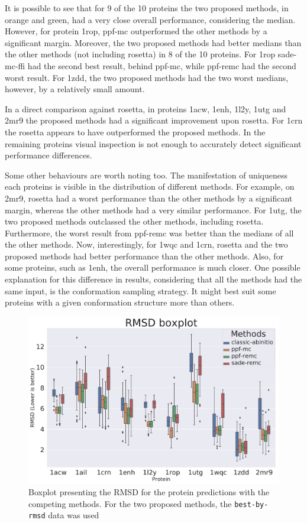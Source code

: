 It is possible to see that for 9 of the 10 proteins the
two proposed methods, in orange and green, had a very close overall performance,
considering the median.
However, for protein 1rop, ppf-mc outperformed the other methods by a
significant margin. Moreover, the two proposed methods had better medians than
the other methods (not including rosetta) in 8 of the 10 proteins. For 1rop
sade-mc-ffi had the second best result, behind ppf-mc, while ppf-remc
had the second worst result. For 1zdd, the two proposed methods had the two worst
medians, however, by a relatively small amount.

In a direct comparison against rosetta, in proteins 1acw, 1enh, 1l2y, 1utg and 2mr9
the proposed methods had a significant improvement upon rosetta. For 1crn the rosetta
appears to have outperformed the proposed methods. In the remaining proteins visual
inspection is not enough to accurately detect significant performance differences.

Some other behaviours are worth noting too. The manifestation of uniqueness each
proteins is visible in the distribution of different methods. For example, on
2mr9, rosetta had a worst performance than the other methods by a significant margin,
whereas the other methods had a very similar performance. For 1utg, the two proposed
methods outclassed the other methods, including rosetta. Furthermore, the worst
result from ppf-remc was better than the medians of all the other methods.
Now, interestingly, for 1wqc and 1crn, rosetta and the two proposed methods had
better performance than the other methods. Also, for some proteins, such as 1enh,
the overall performance is much closer. One possible explanation for this difference
in results, considering that all the methods had the same input, is the conformation
sampling strategy. It might best suit some proteins with a given conformation
structure more than others.

\begin{figure}
  \includegraphics[width=\linewidth]{Figuras/boxplots/boxplot_best_by_rmsd_rmsd_after.pdf}
  \caption{Boxplot presenting the RMSD for the protein predictions with the
    competing methods. For the two proposed methods, the \texttt{best-by-rmsd}
    data was used}
  \label{fig:boxplot-rmsd}
\end{figure}

